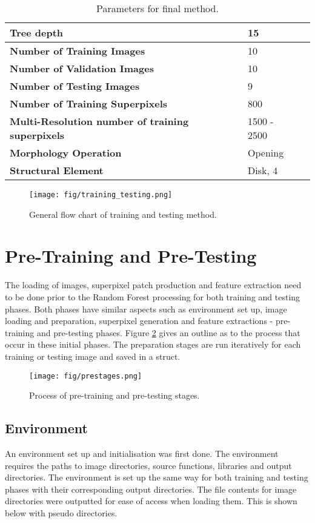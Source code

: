 \begin{table}[H]
\centering
\caption{Parameters for final method.}

\begin{tabular}{|l|l|l|}
\hline
\textbf{Tree depth}	& 15 \\		
\hline
\textbf{Number of Training Images} & 10 \\
\hline
\textbf{Number of Validation Images} & 10\\
\hline		
\textbf{Number of Testing Images} &  9 	\\ 	
\hline
\textbf{Number of Training Superpixels} & 800\\
\hline
\textbf{Multi-Resolution number of training superpixels} & 1500 - 2500\\		
\hline    	 
\textbf{Morphology Operation} & Opening\\
\hline
\textbf{Structural Element}	& Disk, 4\\
\hline
\end{tabular}
\label{table:finalparameters}
\end{table}

\begin{figure}[H]
\centering
\texttt{[image: fig/training\_testing.png]}
\caption{General flow chart of training and testing method.}
\label{fig:training_testing_flow}
\end{figure}

\section{Pre-Training and Pre-Testing}
\label{sect:pre}
The loading of images, superpixel patch production and feature extraction need to be done prior to the Random Forest processing for both training and testing phases. Both phases have similar aspects such as environment set up, image loading and preparation, superpixel generation and feature extractions - pre-training and pre-testing phases. Figure \ref{fig:prestages} gives an outline as to the process that occur in these initial phases. The preparation stages are run iteratively for each training or testing image and saved in a struct.

\begin{figure}[H]
\centering
\texttt{[image: fig/prestages.png]}
\caption{Process of pre-training and pre-testing stages.}
\label{fig:prestages}
\end{figure}

\subsection{Environment}
An environment set up and initialisation was first done. The environment requires the paths to image directories, source functions, libraries and output directories. The environment is set up the same way for both training and testing phases with their corresponding output directories. The file contents for image directories were outputted for ease of access when loading them.  This is shown below with pseudo directories.

